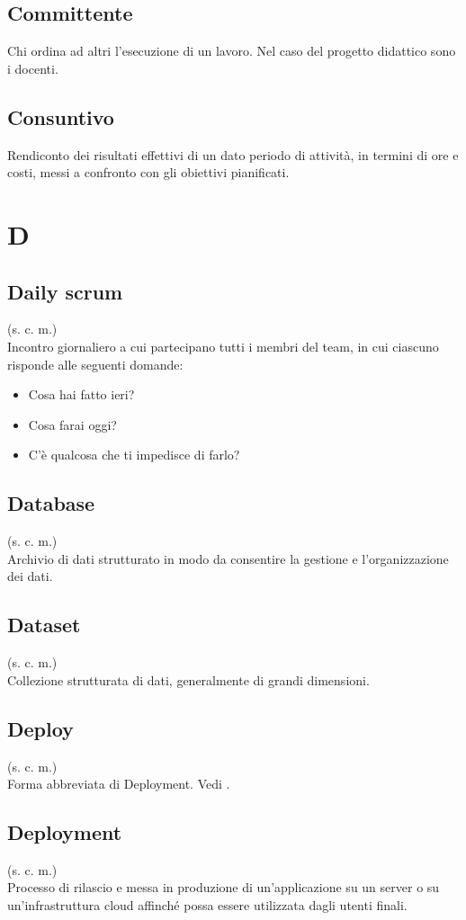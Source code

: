 \subsection{Committente}
Chi ordina ad altri l'esecuzione di un lavoro. Nel caso del progetto didattico
sono i docenti.
\subsection{Consuntivo}
Rendiconto dei risultati effettivi di un dato periodo di attività, in termini
di ore e costi, messi a confronto con gli obiettivi pianificati. \pagebreak
\section{D}
\subsection{Daily scrum}
(s. c. m.)\\
Incontro giornaliero a cui partecipano tutti i membri del team, in cui ciascuno
risponde alle seguenti domande:
\begin{itemize}
    \item Cosa hai fatto ieri?
    \item Cosa farai oggi?
    \item C'è qualcosa che ti impedisce di farlo?
\end{itemize}
\subsection{Database}
(s. c. m.)\\
Archivio di dati strutturato in modo da consentire la gestione e
l'organizzazione dei dati.
\subsection{Dataset}
(s. c. m.)\\
Collezione strutturata di dati, generalmente di grandi dimensioni.
\subsection{Deploy}
(s. c. m.)\\
Forma abbreviata di Deployment. Vedi .
\subsection{Deployment}
(s. c. m.)\\
Processo di rilascio e messa in produzione di un'applicazione su un
server o su un'infrastruttura cloud affinché possa essere utilizzata dagli utenti finali.
